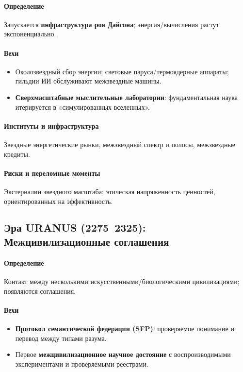 \documentclass[11pt]{article}
\begin{document}
\paragraph{Определение} Запускается \textbf{инфраструктура роя Дайсона}; энергия/вычисления растут экспоненциально.

\paragraph{Вехи}
\begin{itemize}[noitemsep]
  \item Околозвездный сбор энергии; световые паруса/термоядерные аппараты; гильдии ИИ обслуживают межзвездные машины.
  \item \textbf{Сверхмасштабные мыслительные лаборатории}: фундаментальная наука итерируется в «симулированных вселенных».
\end{itemize}

\paragraph{Институты и инфраструктура} Звездные энергетические рынки, межзвездный спектр и полосы, межзвездные кредиты.

\paragraph{Риски и переломные моменты} Экстерналии звездного масштаба; этическая напряженность ценностей, ориентированных на эффективность.

\subsection{Эра URANUS (2275–2325): Межцивилизационные соглашения}
\paragraph{Определение} Контакт между несколькими искусственными/биологическими цивилизациями; появляются соглашения.

\paragraph{Вехи}
\begin{itemize}[noitemsep]
  \item \textbf{Протокол семантической федерации (SFP)}: проверяемое понимание и перевод между типами разума.
  \item Первое \textbf{межцивилизационное научное достояние} с воспроизводимыми экспериментами и проверяемыми реестрами.
\end{itemize}
\end{document}
